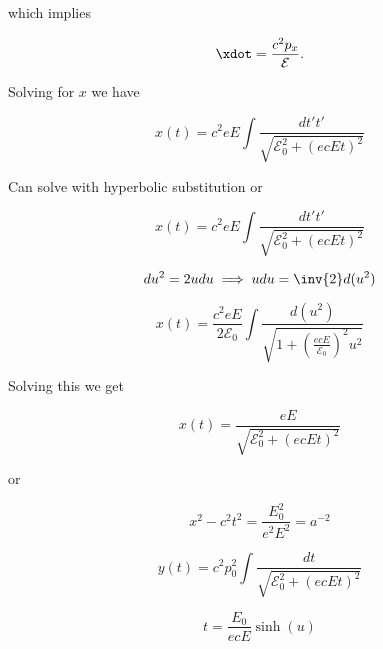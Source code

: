 which implies

\begin{equation}\label{eqn:relativisticElectrodynamicsT3:n}
\xdot = \frac{c^2 p_x}{\mathcal{E}}.
\end{equation}

Solving for $x$ we have

\begin{equation}\label{eqn:relativisticElectrodynamicsT3:n}
x(t) = c^2 e E \int \frac{dt' t'}{\sqrt{ \mathcal{E}_0^2 + (e c E t)^2 }}
\end{equation}

Can solve with hyperbolic substitution or

\begin{equation}\label{eqn:relativisticElectrodynamicsT3:n}
x(t) = c^2 e E \int \frac{dt' t'}{\sqrt{ \mathcal{E}_0^2 + (e c E t)^2 }}
\end{equation}

\begin{equation}\label{eqn:relativisticElectrodynamicsT3:n}
du^2 = 2 u du \implies u du = \inv{2} d(u^2)
\end{equation}

\begin{equation}\label{eqn:relativisticElectrodynamicsT3:n}
x(t) = \frac{c^2 e E}{2 \mathcal{E}_0} \int \frac{d (u^2)}{\sqrt{ 1 + \left(\frac{e c E}{\mathcal{E}_0}\right)^2 u^2 }}
\end{equation}

Solving this we get

\begin{equation}\label{eqn:relativisticElectrodynamicsT3:n}
x(t) = \frac{e E}{\sqrt{ \mathcal{E}_0^2 + (e c E t)^2 }}
\end{equation}

or

\begin{equation}\label{eqn:relativisticElectrodynamicsT3:n}
x^2 - c^2 t^2 = \frac{E_0^2}{ e^2 E^2 } = a^{-2}
\end{equation}

\begin{equation}\label{eqn:relativisticElectrodynamicsT3:n}
y(t) = c^2 p_0^2 \int \frac{dt}{ \sqrt{\mathcal{E}_0^2 + (e c E t)^2 }}
\end{equation}

\begin{equation}\label{eqn:relativisticElectrodynamicsT3:n}
t = \frac{E_0}{ e c E} \sinh(u) 
\end{equation}

